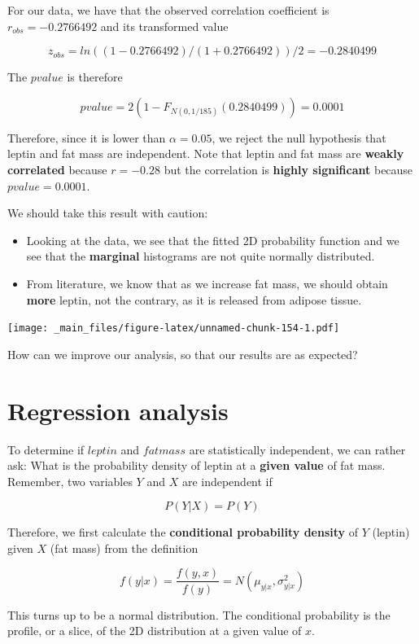 \documentclass[
]{book}
\begin{document}
For our data, we have that the observed correlation coefficient is \(r_{obs}=-0.2766492\) and its transformed value

\[z_{obs}=ln((1-0.2766492)/(1+0.2766492))/2=-0.2840499\]

The \(pvalue\) is therefore

\[pvalue=2(1- F_{N(0,1/185)}(0.2840499))=0.0001\]

Therefore, since it is lower than \(\alpha=0.05\), we reject the null hypothesis that leptin and fat mass are independent. Note that leptin and fat mass are \textbf{weakly correlated} because \(r=-0.28\) but the correlation is \textbf{highly significant} because \(pvalue=0.0001\).

We should take this result with caution:

\begin{itemize}
\item
  Looking at the data, we see that the fitted 2D probability function and we see that the \textbf{marginal} histograms are not quite normally distributed.
\item
  From literature, we know that as we increase fat mass, we should obtain \textbf{more} leptin, not the contrary, as it is released from adipose tissue.
\end{itemize}

\texttt{[image: \_main\_files/figure-latex/unnamed-chunk-154-1.pdf]}

How can we improve our analysis, so that our results are as expected?

\hypertarget{regression-analysis}{%
\section{Regression analysis}\label{regression-analysis}}

To determine if \(leptin\) and \(fatmass\) are statistically independent, we can rather ask: What is the probability density of leptin at a \textbf{given value} of fat mass. Remember, two variables \(Y\) and \(X\) are independent if

\[P(Y|X)=P(Y)\]

Therefore, we first calculate the \textbf{conditional probability density} of \(Y\) (leptin) given \(X\) (fat mass) from the definition

\[f(y|x)=\frac{f(y,x)}{f(y)}
=N(\mu_{y|x}, \sigma^2_{y|x})\]

This turns up to be a normal distribution. The conditional probability is the profile, or a slice, of the 2D distribution at a given value of \(x\).
\end{document}
